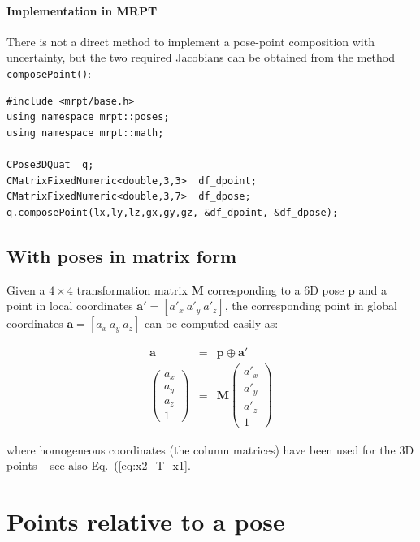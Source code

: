 \documentclass[a4paper,11pt]{report}
\begin{document}
\subsubsection{Implementation in MRPT}

There is not a direct method to implement a pose-point composition with uncertainty, 
but the two required Jacobians can be obtained from the method \texttt{composePoint()}:

\begin{lstlisting}
#include <mrpt/base.h> 
using namespace mrpt::poses; 
using namespace mrpt::math; 

CPose3DQuat  q;
CMatrixFixedNumeric<double,3,3>  df_dpoint;
CMatrixFixedNumeric<double,3,7>  df_dpose;
q.composePoint(lx,ly,lz,gx,gy,gz, &df_dpoint, &df_dpose);
\end{lstlisting}



\section{With poses in matrix form}
\label{sect:comp_point:mat}

Given a $4\times 4$ transformation matrix $\mathbf{M}$ corresponding to a 6D pose 
$\mathbf{p}$ and a point in local coordinates 
$\mathbf{a'} = [a'_x ~ a'_y ~ a'_z]$, the corresponding point in global coordinates
$\mathbf{a} = [a_x ~ a_y ~ a_z]$ can be computed easily as:

\begin{eqnarray}
\mathbf{a} &=& \mathbf{p} \oplus \mathbf{a'} \nonumber \\
\left(\begin{array}{c}
 a_x \\ a_y \\ a_z \\ 1
\end{array}\right)
&=&
\mathbf{M} 
\left(\begin{array}{c}
 a'_x \\ a'_y \\ a'_z \\ 1
\end{array}\right)
\end{eqnarray}

\noindent where homogeneous coordinates (the column matrices) have been used for the 3D points 
-- see also Eq.~(\ref{eq:x2_T_x1}.




\chapter{Points relative to a pose}
\label{ch:inv_pose_point}
\end{document}
